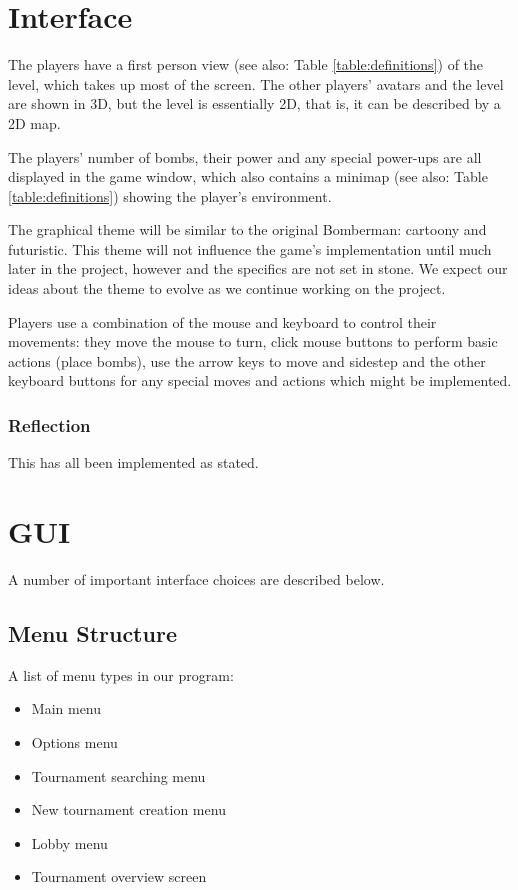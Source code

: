 \section{Interface}
The players have a first person view (see also: Table \ref{table:definitions}) of the level, which takes up most of the screen. The other players' avatars and the level are shown in 3D, but the level is essentially 2D, that is, it can be described by a 2D map.

The players' number of bombs, their power and any special power-ups are all displayed in the game window, which also contains a minimap (see also: Table \ref{table:definitions}) showing the player's environment.

The graphical theme will be similar to the original Bomberman: cartoony and futuristic. This theme will not influence the game's implementation until much later in the project, however and the specifics are not set in stone. We expect our ideas about the theme to evolve as we continue working on the project.

Players use a combination of the mouse and keyboard to control their movements: they move the mouse to turn, click mouse buttons to perform basic actions (place bombs), use the arrow keys to move and sidestep and the other keyboard buttons for any special moves and actions which might be implemented.

\subsubsection{Reflection}
This has all been implemented as stated.

\section{GUI}

A number of important interface choices are described below.

\subsection{Menu Structure}
A list of menu types in our program:

\begin{itemize}
    \item Main menu
    \item Options menu
    \item Tournament searching menu
    \item New tournament creation menu
    \item Lobby menu
    \item Tournament overview screen
\end{itemize}

